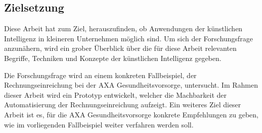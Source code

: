 




\subsection{Zielsetzung}

Diese Arbeit hat zum Ziel, herauszufinden, ob Anwendungen der künstlichen Intelligenz in kleineren Unternehmen möglich sind. Um sich der Forschungsfrage anzunähern, wird ein grober Überblick über die für diese Arbeit relevanten Begriffe, Techniken und Konzepte der künstlichen Intelligenz gegeben. 

Die Forschungsfrage wird an einem konkreten Fallbeispiel, der Rechnungseinreichung bei der AXA Gesundheitsvorsorge, untersucht. Im Rahmen dieser Arbeit wird ein Prototyp entwickelt, welcher die Machbarkeit der Automatisierung der Rechnungseinreichung aufzeigt. Ein weiteres Ziel dieser Arbeit ist es, für die AXA Gesundheitsvorsorge konkrete Empfehlungen zu geben, wie im vorliegenden Fallbeispiel weiter verfahren werden soll.



